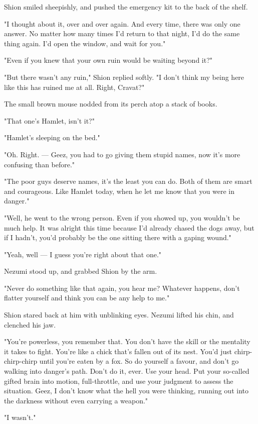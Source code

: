 Shion smiled sheepishly, and pushed the emergency kit to the back of the
shelf.

"I thought about it, over and over again. And every time, there was only
one answer. No matter how many times I'd return to that night, I'd do
the same thing again. I'd open the window, and wait for you."

"Even if you knew that your own ruin would be waiting beyond it?"

"But there wasn't any ruin," Shion replied softly. "I don't think my
being here like this has ruined me at all. Right, Cravat?"

The small brown mouse nodded from its perch atop a stack of books.

"That one's Hamlet, isn't it?"

"Hamlet's sleeping on the bed."

"Oh. Right. --- Geez, you had to go giving them stupid names, now it's
more confusing than before."

"The poor guys deserve names, it's the least you can do. Both of them
are smart and courageous. Like Hamlet today, when he let me know that
you were in danger."

"Well, he went to the wrong person. Even if you showed up, you wouldn't
be much help. It was alright this time because I'd already chased the
dogs away, but if I hadn't, you'd probably be the one sitting there with
a gaping wound."

"Yeah, well --- I guess you're right about that one."

Nezumi stood up, and grabbed Shion by the arm.

"Never do something like that again, you hear me? Whatever happens,
don't flatter yourself and think you can be any help to me."

Shion stared back at him with unblinking eyes. Nezumi lifted his chin,
and clenched his jaw.

"You're powerless, you remember that. You don't have the skill or the
mentality it takes to fight. You're like a chick that's fallen out of
its nest. You'd just chirp-chirp-chirp until you're eaten by a fox. So
do yourself a favour, and don't go walking into danger's path. Don't do
it, ever. Use your head. Put your so-called gifted brain into motion,
full-throttle, and use your judgment to assess the situation. Geez, I
don't know what the hell you were thinking, running out into the
darkness without even carrying a weapon."

"I wasn't."

